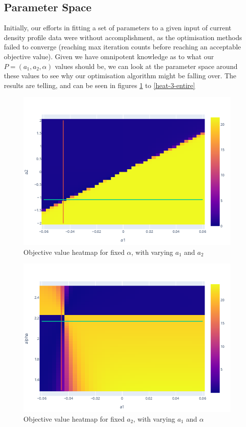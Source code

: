 \subsection{Parameter Space}

Initially, our efforts in fitting a set of parameters to a given input of current density profile data were without accomplishment, as the 
optimisation methods failed to converge (reaching max iteration counts before reaching an acceptable objective value). Given we have 
omnipotent knowledge as to what our $P = (a_1, a_2, \alpha)$ values should be, we can look at the parameter space around 
these values to see why our optimisation algorithm might be falling over. The results are telling, and can be seen in figures \ref{heat-1-entire} 
to \ref{heat-3-entire}


\begin{figure}[h!]
    \centering
    \includegraphics[scale=0.7]{imgs/c4/heat-1-entire.png}
    \caption{Objective value heatmap for fixed $\alpha$, with varying 
    $a_1$ and $a_2$}
    \label{heat-1-entire}
\end{figure}

\begin{figure}[h!]
    \centering
    \includegraphics[scale=0.7]{imgs/c4/heat-2-entire.png}
    \caption{Objective value heatmap for fixed $a_2$, with varying 
    $a_1$ and $\alpha$}
    \label{heat-2-entire}
\end{figure}

